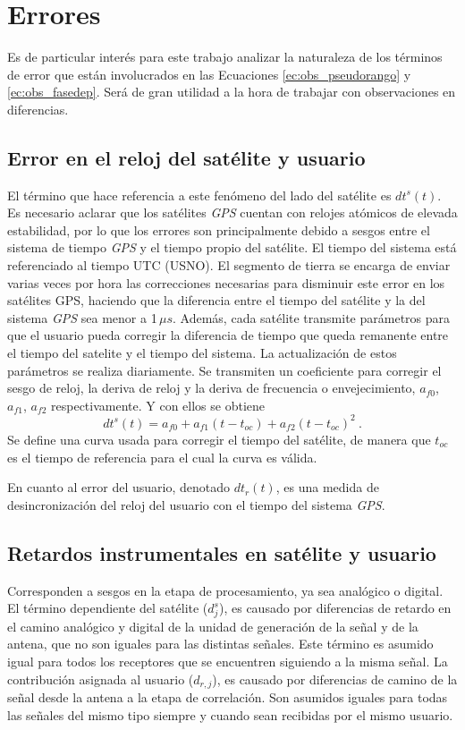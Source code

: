\documentclass[a4paper,12pt,oneside,onecolumn,final,openright]{book}%
\begin{document}
\section{Errores}\label{sec:errores}
	Es de particular interés para este trabajo analizar la naturaleza de los términos de error que están involucrados en las Ecuaciones \eqref{ec:obs_pseudorango} y \eqref{ec:obs_fasedep}. Será de gran utilidad a la hora de trabajar con observaciones en diferencias. 
\subsection*{Error en el reloj del satélite y usuario}
	El término que hace referencia a este fenómeno del lado del satélite es $dt^s(t)$. Es necesario aclarar que los satélites \textit{GPS} cuentan con relojes atómicos de elevada estabilidad, por lo que los errores son principalmente debido a sesgos entre el sistema de tiempo \textit{GPS} y el tiempo propio del satélite. El tiempo del sistema está referenciado al tiempo UTC (USNO). El segmento de tierra se encarga de enviar varias veces por hora las correcciones necesarias para disminuir este error en los satélites GPS, haciendo que la diferencia entre el tiempo del satélite y la del sistema \textit{GPS} sea menor a 1\,$\mu s$. Además, cada satélite transmite parámetros para que el usuario pueda corregir la diferencia de tiempo que queda remanente entre el tiempo del satelite y el tiempo del sistema. La actualización de estos parámetros se realiza diariamente. Se transmiten un coeficiente para corregir el sesgo de reloj, la deriva de reloj y la deriva de frecuencia o envejecimiento, $a_{f0}$, $a_{f1}$, $a_{f2}$ respectivamente. Y con ellos se obtiene 
\begin{equation}\label{ec:corr_satclk}
	dt^s(t) = a_{f0} + a_{f1}(t-t_{oc}) + a_{f2}(t-t_{oc})^2 \ .
\end{equation}
	Se define una curva usada para corregir el tiempo del satélite, de manera que $t_{oc}$ es el tiempo de referencia para el cual la curva es válida.
	
	En cuanto al error del usuario, denotado $dt_r(t)$, es una medida de desincronización del reloj del usuario con el tiempo del sistema \textit{GPS}.
\subsection*{Retardos instrumentales en satélite y usuario}
	Corresponden a sesgos en la etapa de procesamiento, ya sea analógico o digital. El término dependiente del satélite ($d_j^s$), es causado por diferencias de retardo en el camino analógico y digital de la unidad de generación de la señal y de la antena, que no son iguales para las distintas señales. Este término es asumido igual para todos los receptores que se encuentren siguiendo a la misma señal. La contribución asignada al usuario ($d_{r,j}$), es causado por diferencias de camino de la señal desde la antena a la etapa de correlación. Son asumidos iguales para todas las señales del mismo tipo siempre y cuando sean recibidas por el mismo usuario.
	
\end{document}

